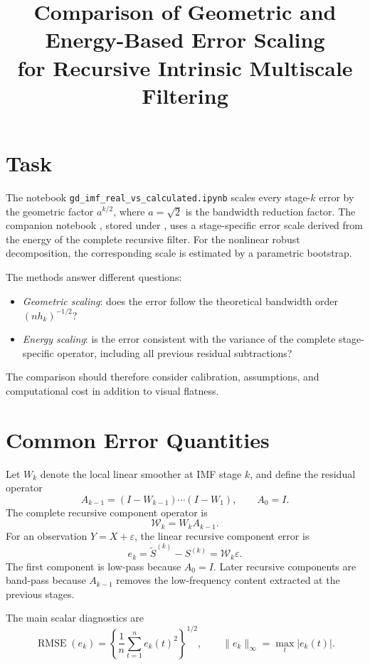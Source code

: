 \documentclass[11pt]{article}
\title{Comparison of Geometric and Energy-Based Error Scaling\\
for Recursive Intrinsic Multiscale Filtering}
\author{}
\date{}
\newcommand{\RMSE}{\operatorname{RMSE}}
\newcommand{\Wcal}{\mathcal{W}}
\begin{document}
\maketitle

\section{Task}

The notebook \texttt{gd\_imf\_real\_vs\_calculated.ipynb} scales every
stage-$k$ error by the geometric factor $a^{k/2}$, where $a=\sqrt{2}$ is the
bandwidth reduction factor. The companion notebook
, stored under
, uses a stage-specific error scale derived from
the energy of the complete recursive filter. For the nonlinear robust
decomposition, the corresponding scale is estimated by a parametric bootstrap.

The methods answer different questions:

\begin{itemize}
    \item \emph{Geometric scaling}: does the error follow the theoretical
    bandwidth order $(nh_k)^{-1/2}$?
    \item \emph{Energy scaling}: is the error consistent with the variance of
    the complete stage-specific operator, including all previous residual
    subtractions?
\end{itemize}

The comparison should therefore consider calibration, assumptions, and
computational cost in addition to visual flatness.

\section{Common Error Quantities}

Let $W_k$ denote the local linear smoother at IMF stage $k$, and define the
residual operator
\[
A_{k-1}=(I-W_{k-1})\cdots(I-W_1),
\qquad A_0=I.
\]
The complete recursive component operator is
\[
\Wcal_k=W_kA_{k-1}.
\]
For an observation $Y=X+\varepsilon$, the linear recursive component error is
\[
e_k=\widetilde S^{(k)}-S^{(k)}=\Wcal_k\varepsilon.
\]
The first component is low-pass because $A_0=I$. Later recursive components are
band-pass because $A_{k-1}$ removes the low-frequency content extracted at the
previous stages.

The main scalar diagnostics are
\[
\RMSE(e_k)=\left\{\frac{1}{n}\sum_{t=1}^n e_k(t)^2\right\}^{1/2},
\qquad
\lVert e_k\rVert_\infty=\max_t |e_k(t)|.
\]
\end{document}

